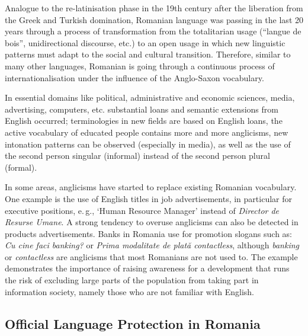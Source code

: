 \begin{multicols}{2}
Analogue to the re-latinisation phase in the 19th century after the liberation from the Greek and Turkish domination, Romanian language was passing in the last 20 years through a process of transformation from the totalitarian usage (“langue de bois”, unidirectional discourse, etc.) to an open usage in which new linguistic patterns must adapt to the social and cultural transition. Therefore, similar to many other languages, Romanian is going through a continuous process of internationalisation under the influence of the Anglo-Saxon vocabulary. 

In essential domains like political, administrative and economic sciences, media, advertising, computers, etc. substantial loans and semantic extensions from English occurred; terminologies in new fields are based on English loans, the active vocabulary of educated people contains more and more anglicisms, new intonation patterns can be observed (especially in media), as well as the use of the second person singular (informal) instead of the second person plural (formal).

In some areas, anglicisms have started to replace existing Romanian vocabulary. One example is the use of English titles in job advertisements, in particular for executive positions, e.\,g., `Human Resource Manager' instead of \textit{Director de Resurse Umane}. A strong tendency to overuse anglicisms can also be detected in products advertisements. Banks in Romania use for promotion slogans such as: \textit{Cu cine faci banking?} or \textit{Prima modalitate de plată contactless}, although \textit{banking} or \textit{contactless} are anglicisms that most Romanians are not used to. 
The example demonstrates the importance of raising awareness for a development that runs the risk of excluding large parts of the population from taking part in information society, namely those who are not familiar with English.

\subsection{Official Language Protection in Romania}


\end{multicols}
